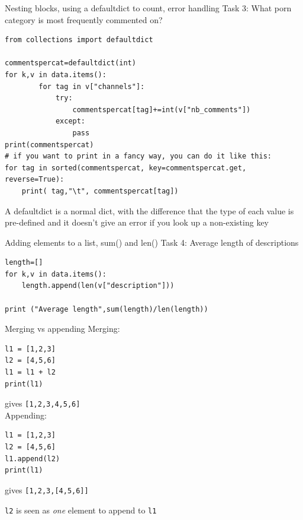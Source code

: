 \documentclass{beamer}
\begin{document}
\begin{frame}[fragile]{Nesting blocks, using a defaultdict to count, error handling}
Task 3: What porn category is most frequently commented on?
\begin{lstlisting}
from collections import defaultdict

commentspercat=defaultdict(int)
for k,v in data.items():
        for tag in v["channels"]:
            try:
                commentspercat[tag]+=int(v["nb_comments"])
            except:
                pass
print(commentspercat)
# if you want to print in a fancy way, you can do it like this:
for tag in sorted(commentspercat, key=commentspercat.get, reverse=True):
    print( tag,"\t", commentspercat[tag])
\end{lstlisting}
\scriptsize{A defaultdict is a normal dict, with the difference that the type of each value is pre-defined and it doesn't give an error if you look up a non-existing key}

\end{frame}





\begin{frame}[fragile]{Adding elements to a list, sum() and len()}
Task 4: Average length of descriptions
\begin{lstlisting}
length=[]
for k,v in data.items():
    length.append(len(v["description"]))
    
print ("Average length",sum(length)/len(length))
\end{lstlisting}

\end{frame}


\begin{frame}[fragile]{Merging vs appending}
Merging:
\begin{lstlisting}
l1 = [1,2,3]
l2 = [4,5,6]
l1 = l1 + l2
print(l1)
\end{lstlisting}
gives \texttt{[1,2,3,4,5,6]}
~\\

Appending:
\begin{lstlisting}
l1 = [1,2,3]
l2 = [4,5,6]
l1.append(l2)
print(l1)
\end{lstlisting}
gives \texttt{[1,2,3,[4,5,6]]}

\texttt{l2} is seen as \emph{one} element to append to \texttt{l1}
\end{frame}
\end{document}
